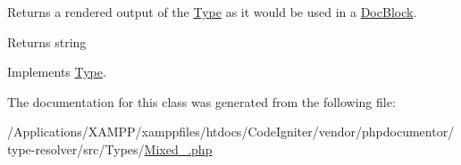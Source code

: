 Returns a rendered output of the \mbox{\hyperlink{interfacephp_documentor_1_1_reflection_1_1_type}{Type}} as it would be used in a \mbox{\hyperlink{classphp_documentor_1_1_reflection_1_1_doc_block}{Doc\+Block}}.

\begin{DoxyReturn}{Returns}
string 
\end{DoxyReturn}


Implements \mbox{\hyperlink{interfacephp_documentor_1_1_reflection_1_1_type_a7516ca30af0db3cdbf9a7739b48ce91d}{Type}}.



The documentation for this class was generated from the following file\+:\begin{DoxyCompactItemize}
\item 
/\+Applications/\+X\+A\+M\+P\+P/xamppfiles/htdocs/\+Code\+Igniter/vendor/phpdocumentor/type-\/resolver/src/\+Types/\mbox{\hyperlink{_mixed___8php}{Mixed\+\_\+.\+php}}\end{DoxyCompactItemize}
